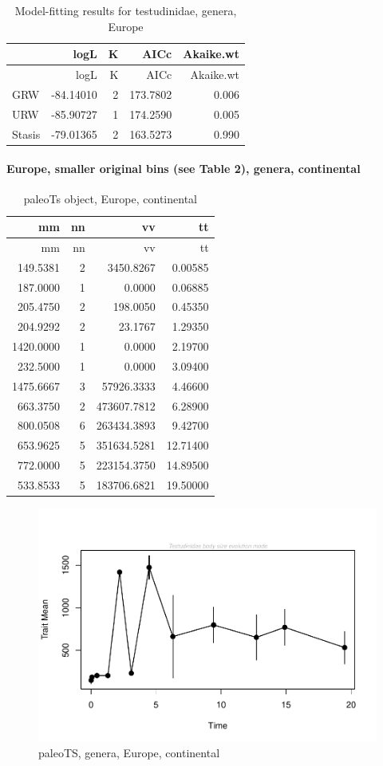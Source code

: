\documentclass[]{article}
\let\oldparagraph\paragraph
\renewcommand{\paragraph}[1]{\oldparagraph{#1}\mbox{}}
\begin{document}
\begin{longtable}[]{@{}lrrrr@{}}
\caption{Model-fitting results for testudinidae, genera,
Europe}\tabularnewline
\toprule
& logL & K & AICc & Akaike.wt\tabularnewline
\midrule
\endfirsthead
\toprule
& logL & K & AICc & Akaike.wt\tabularnewline
\midrule
\endhead
GRW & -84.14010 & 2 & 173.7802 & 0.006\tabularnewline
URW & -85.90727 & 1 & 174.2590 & 0.005\tabularnewline
Stasis & -79.01365 & 2 & 163.5273 & 0.990\tabularnewline
\bottomrule
\end{longtable}

\newpage

\paragraph{Europe, smaller original bins (see Table 2), genera,
continental}\label{europe-smaller-original-bins-see-table-2-genera-continental}

\begin{longtable}[]{@{}rrrr@{}}
\caption{paleoTs object, Europe, continental}\tabularnewline
\toprule
mm & nn & vv & tt\tabularnewline
\midrule
\endfirsthead
\toprule
mm & nn & vv & tt\tabularnewline
\midrule
\endhead
149.5381 & 2 & 3450.8267 & 0.00585\tabularnewline
187.0000 & 1 & 0.0000 & 0.06885\tabularnewline
205.4750 & 2 & 198.0050 & 0.45350\tabularnewline
204.9292 & 2 & 23.1767 & 1.29350\tabularnewline
1420.0000 & 1 & 0.0000 & 2.19700\tabularnewline
232.5000 & 1 & 0.0000 & 3.09400\tabularnewline
1475.6667 & 3 & 57926.3333 & 4.46600\tabularnewline
663.3750 & 2 & 473607.7812 & 6.28900\tabularnewline
800.0508 & 6 & 263434.3893 & 9.42700\tabularnewline
653.9625 & 5 & 351634.5281 & 12.71400\tabularnewline
772.0000 & 5 & 223154.3750 & 14.89500\tabularnewline
533.8533 & 5 & 183706.6821 & 19.50000\tabularnewline
\bottomrule
\end{longtable}

\begin{figure}[htbp]
\centering
\includegraphics{MA_JJ_files/figure-latex/pTSEuC-1.pdf}
\caption{paleoTS, genera, Europe, continental}
\end{figure}
\end{document}
